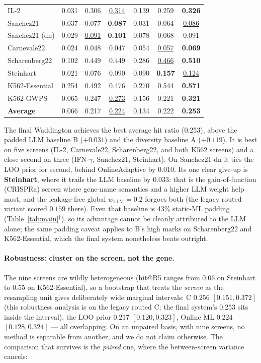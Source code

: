 \documentclass[11pt]{article}
\newcommand{\best}[1]{\textbf{#1}}
\newcommand{\second}[1]{\underline{#1}}
\begin{document}
\begin{table}[H]
\begin{tabular}{lcccccc}
IL-2           & 0.031 & 0.306 & \second{0.314} & 0.139 & 0.259 & \best{0.326} \\
Sanchez21      & 0.037 & 0.077 & \best{0.087} & 0.031 & 0.064 & \second{0.086} \\
Sanchez21 (dn) & 0.029 & \second{0.091} & \best{0.101} & 0.078 & 0.068 & 0.091 \\
Carnevale22    & 0.024 & 0.048 & 0.047 & 0.054 & \second{0.057} & \best{0.069} \\
Scharenberg22  & 0.102 & 0.449 & 0.449 & 0.286 & \second{0.466} & \best{0.510} \\
Steinhart      & 0.021 & 0.076 & 0.090 & 0.090 & \best{0.157} & \second{0.124} \\
K562-Essential & 0.254 & 0.492 & 0.476 & 0.270 & \second{0.544} & \best{0.571} \\
K562-GWPS      & 0.065 & 0.247 & \second{0.273} & 0.156 & 0.221 & \best{0.321} \\
\midrule
\textbf{Average} & 0.066 & 0.217 & \second{0.224} & 0.134 & 0.222 & \best{0.253} \\
\bottomrule
\end{tabular}
\end{table}

The final Waddington achieves the best average hit ratio (0.253), above the padded LLM baseline B
($+0.031$) and the diversity baseline A ($+0.119$). It is best on five screens (IL-2, Carnevale22,
Scharenberg22, and both K562 screens) and a close second on three (IFN-$\gamma$, Sanchez21, Steinhart).
On Sanchez21-dn it ties the LOO prior for second, behind OnlineAdaptive by $0.010$. Its one clear give-up is \textbf{Steinhart}, where it trails the LLM baseline by $0.033$:
that is the gain-of-function (CRISPRa) screen where gene-name semantics and a higher LLM weight help most,
and the leakage-free global $w_{\mathrm{LLM}}{=}0.2$ forgoes both (the legacy routed variant scored $0.159$ there). Even that baseline is $43\%$ static-ML padding (Table~\ref{tab:main}$^\dagger$), so its advantage
cannot be cleanly attributed to the LLM alone; the same padding caveat applies to B's high marks on
Scharenberg22 and K562-Essential, which the final system nonetheless beats outright.

\paragraph{Robustness: cluster on the screen, not the gene.} The nine screens are wildly heterogeneous
(hit@R5 ranges from $0.06$ on Steinhart to $0.55$ on K562-Essential), so a bootstrap that treats the
\emph{screen} as the resampling unit gives deliberately wide marginal intervals: C $0.256$
$[0.151, 0.372]$ (this robustness analysis is on the legacy routed C; the final system's $0.253$ sits
inside the interval), the LOO prior $0.217$ $[0.120, 0.323]$, Online ML $0.224$ $[0.128, 0.324]$ --- all
overlapping. On an unpaired basis, with nine screens, no method is separable from another, and we do not
claim otherwise. The comparison that survives is the \emph{paired} one, where the between-screen variance
cancels:
\end{document}

